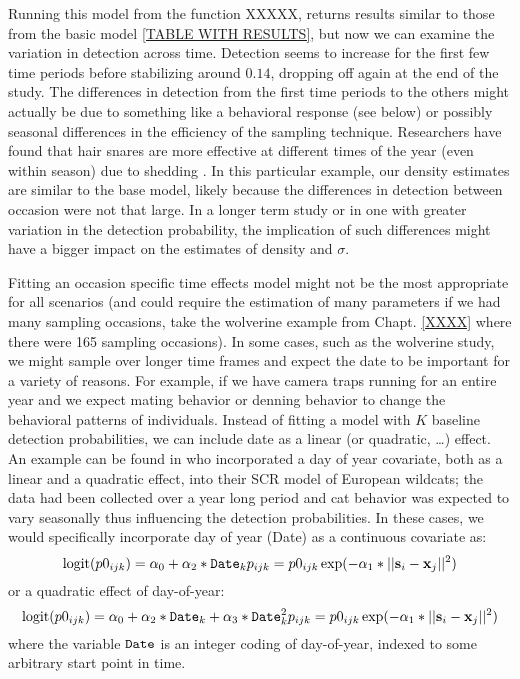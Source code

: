 Running this model from the function XXXXX, returns results similar to those from the basic
model \ref{TABLE WITH RESULTS}, but now we can examine the variation in detection across time.
Detection seems to
increase for the first few time periods before stabilizing around $0.14$, 
dropping off again at the end of the study.
The differences in detection from the first time periods to the others might
actually be due to something like a behavioral response (see below) or possibly seasonal
differences in the efficiency of the sampling technique.
Researchers have found that hair snares are more effective at different
times of the year (even within season) due to shedding \citep{wegan_etal:inpress}.
In this particular example, our density estimates are
similar to the base model, likely because the differences in detection between occasion were not that large.
In a longer term study or in one with greater variation in the detection probability,
the implication of such differences might have a bigger impact on the estimates of density
and $\sigma$.

Fitting an occasion specific time effects model might not be the most 
appropriate for all scenarios (and could require the estimation of many parameters
if we had many sampling occasions, take the wolverine example from Chapt. \ref{XXXX} 
where there were 165 sampling
occasions).  In some cases, such as the wolverine study, 
we might sample over longer time frames and
expect the date to be important for a variety of reasons.  For
example, if we have camera traps running for an entire year and we
expect mating behavior or denning behavior to change the behavioral
patterns of individuals. Instead of fitting a model with $K$ baseline
detection probabilities, we can include date as a linear (or
quadratic, \ldots) effect. An example can be found in
\citet{kery_etal:2011} who incorporated a day of year covariate, both
as a linear and a quadratic effect, into their SCR model of European
wildcats; the data had been collected over a year long period and cat
behavior was expected to vary seasonally thus influencing the
detection probabilities.  In these cases, we would specifically
incorporate day of year (Date) as a continuous covariate as:
\[
\mbox{logit}(p0_{ijk}) = \alpha_0 + \alpha_2*\mbox{\tt Date}_{k}
p_{ijk} = p0_{ijk} \exp(- \alpha_1*||{\bf s}_{i}-{\bf x}_{j}||^2)
\]
or a quadratic effect of day-of-year:
\[
\mbox{logit}(p0_{ijk}) = \alpha_0 + \alpha_2*\mbox{\tt Date}_{k}
 + \alpha_3*\mbox{\tt Date}_{k}^{2}
p_{ijk} = p0_{ijk} \exp(- \alpha_1*||{\bf s}_{i}-{\bf x}_{j}||^2)

\]
where the variable $\mbox{\tt Date}$ is an integer coding of
day-of-year, indexed to some arbitrary start point in time.

